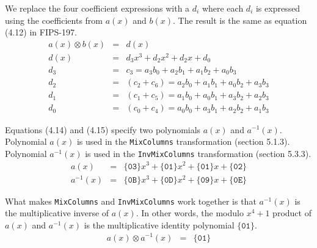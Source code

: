 \documentclass{article}
\begin{document}
We replace the four coefficient expressions with a $d_i$
where each $d_i$ is expressed using the coefficients from $a(x)$ and $b(x)$.
The result is the same as equation (4.12) in FIPS-197.
\begin{eqnarray*}
  a(x) \otimes b(x) &=& d(x) \\
  d(x) &=& d_3 x^3 + d_2 x^2 + d_2 x + d_0 \\
  d_3 &=& c_3 = a_3 b_0 + a_2 b_1 + a_1 b_2 + a_0 b_3 \\
  d_2 &=& (c_2 + c_6) = a_2 b_0 + a_1 b_1 + a_0 b_2 + a_3 b_3 \\
  d_1 &=& (c_1 + c_5) = a_1 b_0 + a_0 b_1 + a_3 b_2 + a_2 b_3 \\
  d_0 &=& (c_0 + c_4) = a_0 b_0 + a_3 b_1 + a_2 b_2 + a_1 b_3
\end{eqnarray*}

Equations (4.14) and (4.15) specify two polynomials $a(x)$ and $a^{-1}(x)$.
Polynomial $a(x)$ is used in the \texttt{MixColumns} transformation (section 5.1.3).
Polynomial $a^{-1}(x)$ is used in the \texttt{InvMixColumns} transformation (section 5.3.3).
\begin{eqnarray*}
  a(x) &=& \{\mathtt{03}\}x^3 + \{\mathtt{01}\}x^2 + \{\mathtt{01}\}x + \{\mathtt{02}\} \\
  a^{-1}(x) &=& \{\mathtt{0B}\}x^3 + \{\mathtt{0D}\}x^2 + \{\mathtt{09}\}x + \{\mathtt{0E}\}
\end{eqnarray*}

What makes \texttt{MixColumns} and \texttt{InvMixColumns} work together
is that $a^{-1}(x)$ is the multiplicative inverse of $a(x)$.
In other words, the modulo $x^4+1$ product of $a(x)$ and $a^{-1}(x)$ 
is the multiplicative identity polynomial $\{\mathtt{01}\}$.
\begin{eqnarray*}
  a(x) \otimes a^{-1}(x) &=& \{\mathtt{01}\}
\end{eqnarray*}
\end{document}
